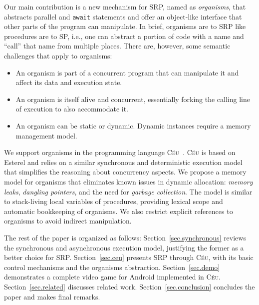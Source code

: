\documentclass{acm_proc_article-sp}
\newcommand{\CEU}{\textsc{C\'{e}u}\xspace}
\newcommand{\code}[1] {{\small{\texttt{#1}}}}
\newcommand{\1}{\;}
\newcommand{\2}{\;\;}
\newcommand{\3}{\;\;\;}
\newcommand{\5}{\;\;\;\;\;}
\begin{document}
Our main contribution is a new mechanism for SRP, named as \emph{organisms}, 
that abstracts parallel and \code{await} statements and offer an object-like 
interface that other parts of the program can manipulate.
%
In brief, organisms are to SRP like procedures are to SP, i.e., one can 
abstract a portion of code with a name and ``call'' that name from multiple 
places.
%
There are, however, some semantic challenges that apply to organisms:
%
\begin{itemize}
\item An organism is part of a concurrent program that can manipulate it and 
affect its data and execution state.
\item An organism is itself alive and concurrent, essentially forking the 
calling line of execution to also accommodate it.
\item An organism can be static or dynamic. Dynamic instances require a memory 
management model.
\end{itemize}

We support organisms in the programming language \CEU~\cite{ceu.sensys13}.
%
\CEU is based on Esterel and relies on a similar synchronous and deterministic 
execution model that simplifies the reasoning about concurrency aspects.
%
We propose a memory model for organisms that eliminates known issues in dynamic 
allocation: \emph{memory leaks}, \emph{dangling pointers}, and the need for 
\emph{garbage collection}.
%
The model is similar to stack-living local variables of procedures, providing 
lexical scope and automatic bookkeeping of organisms.
We also restrict explicit references to organisms to avoid indirect 
manipulation.

The rest of the paper is organized as follows:
Section~\ref{sec.synchronous} reviews the synchronous and asynchronous 
execution model, justifying the former as a better choice for SRP.
Section~\ref{sec.ceu} presents SRP through \CEU, with its basic control 
mechanisms and the organisms abstraction.
Section~\ref{sec.demo} demonstrates a complete video game for Android 
implemented in \CEU.
Section~\ref{sec.related} discusses related work.
Section~\ref{sec.conclusion} concludes the paper and makes final remarks.
\end{document}
